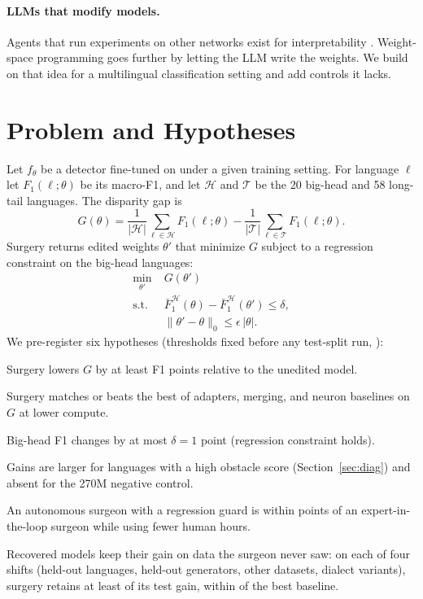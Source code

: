 \documentclass[11pt]{article}
\begin{document}
\paragraph{LLMs that modify models.} Agents that run experiments on other networks exist for interpretability \citep{rottshaham2024maia}. Weight-space programming \citep{takehi2026weightspace} goes further by letting the LLM write the weights. We build on that idea for a multilingual classification setting and add controls it lacks.

\section{Problem and Hypotheses}
\label{sec:problem}
Let $f_\theta$ be a detector fine-tuned on \bluff{} under a given training setting. For language $\ell$ let $F_1(\ell;\theta)$ be its macro-F1, and let $\mathcal{H}$ and $\mathcal{T}$ be the 20 big-head and 58 long-tail languages. The disparity gap is
\begin{equation}
G(\theta) = \frac{1}{|\mathcal{H}|}\sum_{\ell\in\mathcal{H}} F_1(\ell;\theta) - \frac{1}{|\mathcal{T}|}\sum_{\ell\in\mathcal{T}} F_1(\ell;\theta).
\end{equation}
Surgery returns edited weights $\theta'$ that minimize $G$ subject to a regression constraint on the big-head languages:
\begin{equation}
\begin{split}
\min_{\theta'}\; & G(\theta') \\
\text{s.t.}\; & \bar F_1^{\mathcal{H}}(\theta) - \bar F_1^{\mathcal{H}}(\theta') \le \delta, \\
& \|\theta'-\theta\|_0 \le \epsilon\,|\theta|.
\end{split}
\end{equation}
We pre-register six hypotheses (thresholds fixed before any test-split run, ):
\begin{description}\itemsep0pt
\item[H1] Surgery lowers $G$ by at least \xx{} F1 points relative to the unedited model.
\item[H2] Surgery matches or beats the best of adapters, merging, and neuron baselines on $G$ at lower compute.
\item[H3] Big-head F1 changes by at most $\delta=1$ point (regression constraint holds).
\item[H4] Gains are larger for languages with a high obstacle score (Section~\ref{sec:diag}) and absent for the 270M negative control.
\item[H5] An autonomous surgeon with a regression guard is within \xx{} points of an expert-in-the-loop surgeon while using fewer human hours.
\item[H6] Recovered models keep their gain on data the surgeon never saw: on each of four shifts (held-out languages, held-out generators, other datasets, dialect variants), surgery retains at least \xx{} of its \bluff{} test gain, within \xx{} of the best baseline.
\end{description}
\end{document}
